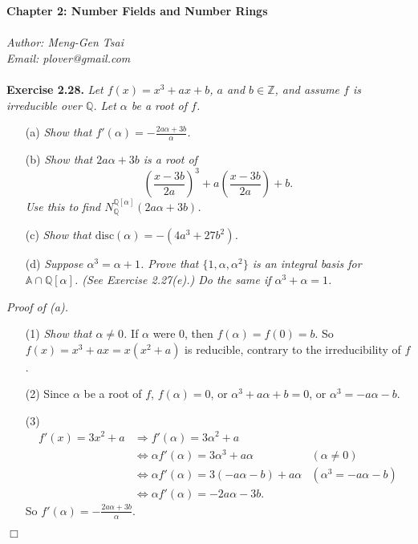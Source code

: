 \documentclass{article}
\begin{document}
\textbf{\Large Chapter 2: Number Fields and Number Rings} \\\\



\emph{Author: Meng-Gen Tsai} \\
\emph{Email: plover@gmail.com} \\\\






\textbf{Exercise 2.28.}
\emph{Let $f(x) = x^3+ax+b$, $a$ and $b \in \mathbb{Z}$,
and assume $f$ is irreducible over $\mathbb{Q}$.
Let $\alpha$ be a root of $f$.}
\begin{enumerate}
\item[(a)]
\emph{Show that $f'(\alpha) = -\frac{2a\alpha+3b}{\alpha}$.}
\item[(b)]
\emph{Show that $2a\alpha+3b$ is a root of
$$\left( \frac{x-3b}{2a} \right)^3 + a\left( \frac{x-3b}{2a} \right) + b.$$
Use this to find $N_{\mathbb{Q}}^{\mathbb{Q}[\alpha]} (2a\alpha+3b)$.}
\item[(c)]
\emph{Show that $\text{disc}(\alpha) = -(4a^3+27b^2)$.}
\item[(d)]
\emph{Suppose $\alpha^3=\alpha+1$.
Prove that $\{1,\alpha,\alpha^2\}$ is an integral basis for $\mathbb{A}\cap\mathbb{Q}[\alpha]$.
(See Exercise 2.27(e).)
Do the same if $\alpha^3+\alpha=1$.} \\
\end{enumerate}

\emph{Proof of (a).}
\begin{enumerate}
\item[(1)]
\emph{Show that $\alpha \neq 0$.}
If $\alpha$ were $0$, then $f(\alpha) = f(0) = b$.
So $f(x) = x^3+ax = x(x^2+a)$ is reducible, contrary to the irreducibility of $f$.
\item[(2)]
Since $\alpha$ be a root of $f$,
$f(\alpha) = 0$,
or $\alpha^3 + a\alpha + b = 0$,
or $\alpha^3 = -a\alpha-b$.
\item[(3)]
\begin{align*}
f'(x) = 3x^2 + a
&\Longrightarrow
f'(\alpha) = 3\alpha^2 + a \\
&\Longleftrightarrow
\alpha f'(\alpha) = 3\alpha^3 + a\alpha
  &(\alpha \neq 0) \\
&\Longleftrightarrow
\alpha f'(\alpha) = 3(-a\alpha-b) + a\alpha
  &(\alpha^3 = -a\alpha-b) \\
&\Longleftrightarrow
\alpha f'(\alpha) = -2a\alpha-3b.
\end{align*}
So $f'(\alpha) = -\frac{2a\alpha+3b}{\alpha}$.
\end{enumerate}
$\Box$ \\
\end{document}
